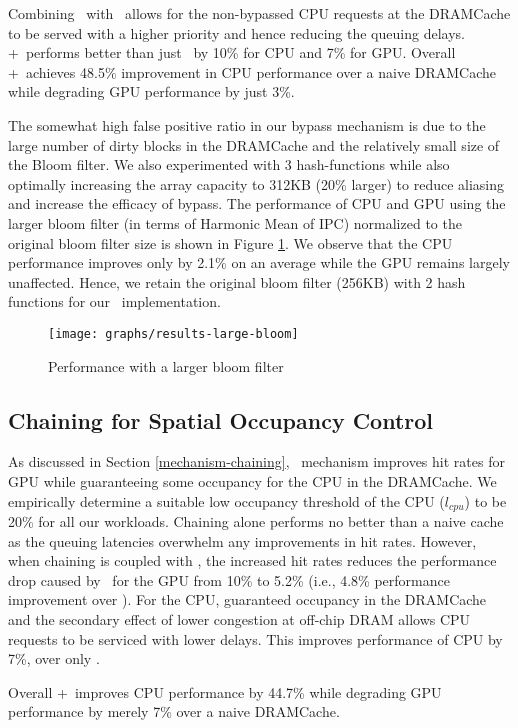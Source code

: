 \par Combining \prioname\ with \bypassname\ allows for the non-bypassed CPU requests at the DRAMCache to be served with a higher priority and hence reducing the queuing delays. \bypassname+\prioname\ performs better than just \prioname\ by 10\% for CPU and 7\% for GPU. Overall \bypassname+\prioname\ achieves 48.5\% improvement in CPU performance over a naive DRAMCache while degrading GPU performance by just 3\%.

\par The somewhat high false positive ratio in our bypass mechanism is due to the large number of dirty blocks in the DRAMCache and the relatively small size of the Bloom filter.  We also experimented with 3 hash-functions while also optimally increasing the array capacity to 312KB (20\% larger) to reduce aliasing and increase the efficacy of bypass. The performance of CPU and GPU using the larger bloom filter (in terms of Harmonic Mean of IPC) normalized to the original bloom filter size is shown in Figure \ref{large-bloom}. We observe that the CPU performance improves only by 2.1\% on an average while the GPU remains largely unaffected. Hence, we retain the original bloom filter (256KB) with 2 hash functions for our \bypassname\ implementation.

\begin{figure}[htb]
	\centering
	\texttt{[image: graphs/results-large-bloom]}
	\caption{Performance with a larger bloom filter}
	\label{large-bloom}
\end{figure}

\subsection{Chaining for Spatial Occupancy Control}
As discussed in Section \ref{mechanism-chaining}, \chaining\ mechanism improves hit rates for GPU while guaranteeing some occupancy for the CPU in the DRAMCache. We empirically determine a suitable low occupancy threshold of the CPU (\textit{$l_{cpu}$}) to be 20\% for all our workloads. Chaining alone performs no better than a naive cache as the queuing latencies overwhelm any improvements in hit rates. However, when chaining is coupled with \prioname, the increased hit rates reduces the performance drop caused by \prioname\ for the GPU from 10\% to 5.2\% (i.e., 4.8\% performance improvement over \prioname). For the CPU, guaranteed occupancy in the DRAMCache and the secondary effect of lower congestion at off-chip DRAM allows CPU requests to be serviced with lower delays. This improves performance of CPU by 7\%, over only \prioname.
\par Overall \chaining+\prioname\ improves CPU performance by 44.7\% while degrading GPU performance by merely 7\% over a naive DRAMCache.


